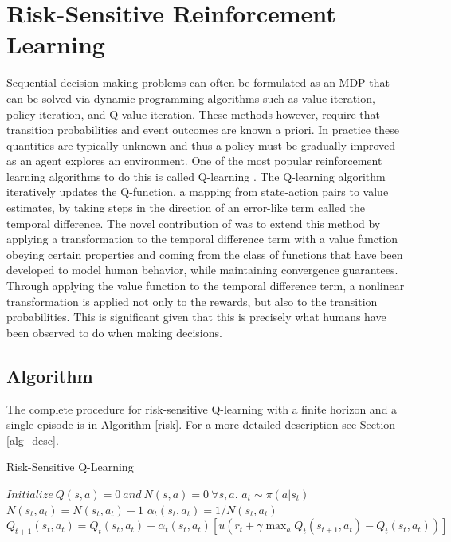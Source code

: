 \documentclass{article}
\begin{document}
\section{Risk-Sensitive Reinforcement Learning}
Sequential decision making problems can often be formulated as an MDP that can be solved via dynamic programming algorithms such as value iteration, policy iteration, and Q-value iteration. These methods however, require that transition probabilities and event outcomes are known a priori. In practice these quantities are typically unknown and thus a policy must be gradually improved as an agent explores an environment. One of the most popular reinforcement learning algorithms to do this is called Q-learning \cite{sutton1998reinforcement}. The Q-learning algorithm iteratively updates the Q-function, a mapping from state-action pairs to value estimates, by taking steps in the direction of an error-like term called the temporal difference. The novel contribution of \cite{DBLP:journals/corr/ShenTSO13} was to extend this method by applying a transformation to the temporal difference term with a value function obeying certain properties and coming from the class of functions that have been developed to model human behavior, while maintaining convergence guarantees. Through applying the value function to the temporal difference term, a nonlinear transformation is applied not only to the rewards, but also to the transition probabilities. This is significant given that this is precisely what humans have been observed to do when making decisions.


\subsection{Algorithm}
The complete procedure for risk-sensitive Q-learning with a finite horizon and a single episode is in Algorithm \ref{risk}. For a more detailed description see Section \ref{alg_desc}.
\begin{algorithm}
\caption{Risk-Sensitive Q-Learning}\label{risk}
\begin{algorithmic}[1]
\State $\textit{Initialize} \ Q(s, a) = 0 \ \textit{and} \ N(s, a) = 0 \ \forall s, a.$
    \State $a_t \sim \pi(a|s_t)$
    \State $N(s_t, a_t) = N(s_t, a_t) + 1$
    \State $\alpha_t(s_t, a_t) = 1/N(s_t, a_t)$
    \State $Q_{t+1}(s_t, a_t) = Q_t(s_t, a_t) + \alpha_t(s_t, a_t)\left[u(r_t + \gamma \max_a Q_t(s_{t+1}, a_t) - Q_t(s_t, a_t))\right]$
    \EndFor
\EndProcedure
\end{algorithmic}
\end{algorithm}
\vspace{-4mm}
\end{document}
